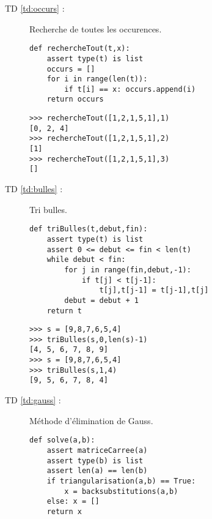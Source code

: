 \begin{description}
\item[TD \ref{td:occurs} :] Recherche de toutes les occurences.

\begin{py}{6cm}
\begin{verbatim}
def rechercheTout(t,x):
    assert type(t) is list
    occurs = []
    for i in range(len(t)):
        if t[i] == x: occurs.append(i)
    return occurs
\end{verbatim}
\end{py}
\hfill
\begin{py}{6cm}
\begin{verbatim}
>>> rechercheTout([1,2,1,5,1],1)
[0, 2, 4]
>>> rechercheTout([1,2,1,5,1],2)
[1]
>>> rechercheTout([1,2,1,5,1],3)
[]
\end{verbatim}
\end{py}
\vspace*{2mm}

\newpage
\item[TD \ref{td:bulles} :] Tri bulles.

\begin{py}{6cm}
\begin{verbatim}
def triBulles(t,debut,fin):
    assert type(t) is list
    assert 0 <= debut <= fin < len(t)
    while debut < fin:
        for j in range(fin,debut,-1):
            if t[j] < t[j-1]: 
                t[j],t[j-1] = t[j-1],t[j]
        debut = debut + 1
    return t
\end{verbatim}
\end{py}
\hfill
\begin{py}{6cm}
\begin{verbatim}
>>> s = [9,8,7,6,5,4]
>>> triBulles(s,0,len(s)-1)
[4, 5, 6, 7, 8, 9]
>>> s = [9,8,7,6,5,4]
>>> triBulles(s,1,4)
[9, 5, 6, 7, 8, 4]
\end{verbatim}
\end{py}
\vspace*{2mm}


\item[TD \ref{td:gauss} :] Méthode d'élimination de {\sc Gauss}.

\begin{py}{6cm}
\begin{verbatim}
def solve(a,b):
    assert matriceCarree(a) 
    assert type(b) is list
    assert len(a) == len(b)
    if triangularisation(a,b) == True:
        x = backsubstitutions(a,b)
    else: x = []
    return x


\end{verbatim}
\end{py}
\end{description}
